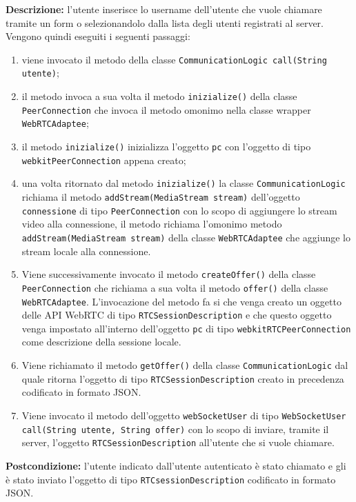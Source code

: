 \begin{sloppypar}
\textbf{Descrizione: }l'utente inserisce lo username dell'utente che vuole chiamare tramite un form o selezionandolo dalla lista degli utenti registrati al server\g. Vengono quindi eseguiti i seguenti passaggi:
\begin{enumerate}
	\item viene invocato il metodo della classe \texttt{CommunicationLogic call(String utente)};
	\item il metodo invoca a sua volta il metodo \texttt{inizialize()} della classe \texttt{PeerConnection} che invoca il metodo omonimo nella classe wrapper \texttt{WebRTCAdaptee};
	\item il metodo \texttt{inizialize()} inizializza l'oggetto \texttt{pc} con l'oggetto di tipo \texttt{webkitPeerConnection} appena creato;
	\item una volta ritornato dal metodo \texttt{inizialize()} la classe \texttt{CommunicationLogic} richiama il metodo \texttt{addStream(MediaStream stream)} dell'oggetto \texttt{connessione} di tipo \texttt{PeerConnection} con lo scopo di aggiungere lo stream video alla connessione, il metodo richiama l'omonimo metodo \texttt{addStream(MediaStream stream)} della classe \texttt{WebRTCAdaptee} che aggiunge lo stream locale alla connessione.
	\item Viene successivamente invocato il metodo \texttt{createOffer()} della classe \texttt{PeerConnection} che richiama a sua volta il metodo \texttt{offer()} della classe \texttt{WebRTCAdaptee}. L'invocazione del metodo fa si che venga creato un oggetto delle API WebRTC di tipo \texttt{RTCSessionDescription} e che questo oggetto venga impostato all'interno dell'oggetto \texttt{pc} di tipo \texttt{webkitRTCPeerConnection} come descrizione della sessione locale.
	\item Viene richiamato il metodo \texttt{getOffer()} della classe \texttt{CommunicationLogic} dal quale ritorna l'oggetto di tipo \texttt{RTCSessionDescription} creato in precedenza codificato in formato JSON.
	\item Viene invocato il metodo dell'oggetto \texttt{webSocketUser} di tipo \texttt{WebSocketUser} \texttt{call(String utente, String offer)} con lo scopo di inviare, tramite il server, l'oggetto \texttt{RTCSessionDescription} all'utente che si vuole chiamare.
\end{enumerate}
\textbf{Postcondizione: } l'utente indicato dall'utente autenticato è stato chiamato e gli è stato inviato l'oggetto di tipo \texttt{RTCsessionDescription} codificato in formato JSON.
\newpage



\end{sloppypar}

